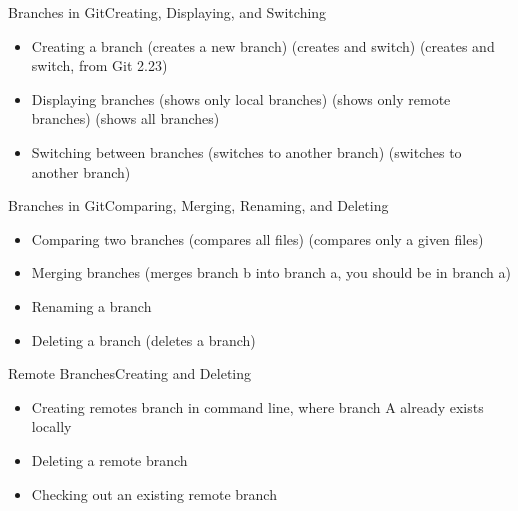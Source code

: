  \begin{frame}{Branches in Git}{Creating, Displaying, and Switching}
  \begin{itemize}
\item Creating a branch
   (creates a new branch)
   (creates and switch)
   (creates and switch, from Git 2.23)
\item Displaying branches
   (shows only local branches)
   (shows only remote branches)
   (shows all branches)
\item Switching between branches
   (switches to another branch)
   (switches to another branch)
\end{itemize}
\end{frame}

 \begin{frame}{Branches in Git}{Comparing, Merging, Renaming, and Deleting}
  \begin{itemize}
\item Comparing two branches
   (compares all files)
   (compares only a given files)
\item Merging branches
   (merges branch b into branch a, you should be in branch a)
\item Renaming a branch
\item Deleting a branch 
   (deletes a branch)
\end{itemize}
\end{frame}

\begin{frame}{Remote Branches}{Creating and Deleting}
  \begin{itemize}
    \item Creating remotes branch in command line, where branch A already exists locally
     \item Deleting a remote branch 
    \item Checking out an existing remote branch 
  \end{itemize}
\end{frame}
